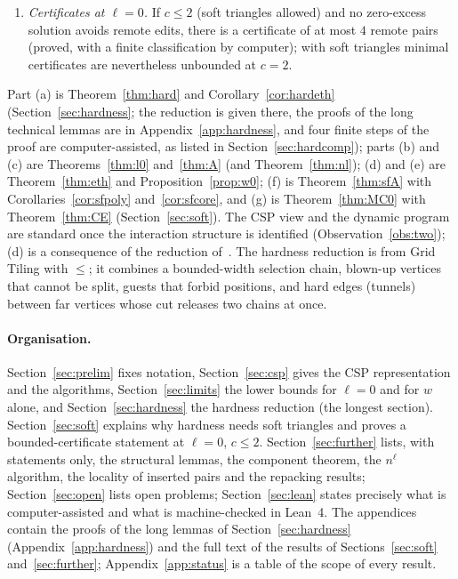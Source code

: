 \begin{theorem}
\begin{enumerate}
\item[(g)] \emph{Certificates at $\ell=0$.} If $c\le2$ (soft triangles allowed) and no zero-excess solution avoids remote edits, there is a certificate of at most $4$ remote pairs (proved, with a finite classification by computer); with soft triangles minimal certificates are nevertheless unbounded at $c=2$.
\end{enumerate}
\end{theorem}
Part (a) is Theorem~\ref{thm:hard} and Corollary~\ref{cor:hardeth} (Section~\ref{sec:hardness}; the reduction is given there, the proofs of the long technical lemmas are in Appendix~\ref{app:hardness}, and four finite steps of the proof are computer-assisted, as listed in Section~\ref{sec:hardcomp}); parts (b) and (c) are Theorems~\ref{thm:l0} and~\ref{thm:A} (and Theorem~\ref{thm:nl}); (d) and (e) are Theorem~\ref{thm:eth} and Proposition~\ref{prop:w0}; (f) is Theorem~\ref{thm:sfA} with Corollaries~\ref{cor:sfpoly} and~\ref{cor:sfcore}, and (g) is Theorem~\ref{thm:MC0} with Theorem~\ref{thm:CE} (Section~\ref{sec:soft}). The CSP view and the dynamic program are standard once the interaction structure is identified (Observation~\ref{obs:two}); (d) is a consequence of the reduction of~\cite{LPS23}. The hardness reduction is from Grid Tiling with $\le$; it combines a bounded-width selection chain, blown-up vertices that cannot be split, guests that forbid positions, and hard edges (tunnels) between far vertices whose cut releases two chains at once.

\paragraph{Organisation.} Section~\ref{sec:prelim} fixes notation, Section~\ref{sec:csp} gives the CSP representation and the algorithms, Section~\ref{sec:limits} the lower bounds for $\ell=0$ and for $w$ alone, and Section~\ref{sec:hardness} the hardness reduction (the longest section). Section~\ref{sec:soft} explains why hardness needs soft triangles and proves a bounded-certificate statement at $\ell=0$, $c\le2$. Section~\ref{sec:further} lists, with statements only, the structural lemmas, the component theorem, the $n^{\ell}$ algorithm, the locality of inserted pairs and the repacking results; Section~\ref{sec:open} lists open problems; Section~\ref{sec:lean} states precisely what is computer-assisted and what is machine-checked in Lean~4. The appendices contain the proofs of the long lemmas of Section~\ref{sec:hardness} (Appendix~\ref{app:hardness}) and the full text of the results of Sections~\ref{sec:soft} and~\ref{sec:further}; Appendix~\ref{app:status} is a table of the scope of every result.

